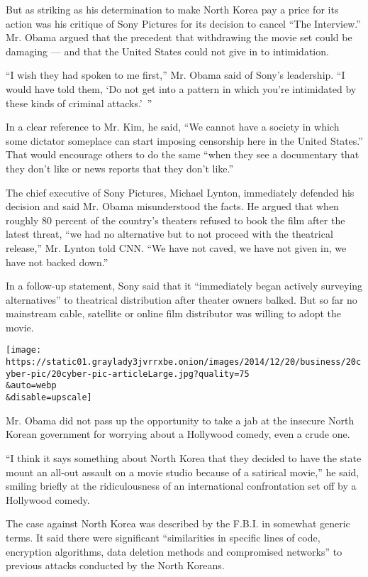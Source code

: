 But as striking as his determination to make North Korea pay a price for
its action was his critique of Sony Pictures for its decision to cancel
``The Interview.'' Mr. Obama argued that the precedent that withdrawing
the movie set could be damaging --- and that the United States could not
give in to intimidation.

``I wish they had spoken to me first,'' Mr. Obama said of Sony's
leadership. ``I would have told them, `Do not get into a pattern in
which you're intimidated by these kinds of criminal attacks.'~''

In a clear reference to Mr. Kim, he said, ``We cannot have a society in
which some dictator someplace can start imposing censorship here in the
United States.'' That would encourage others to do the same ``when they
see a documentary that they don't like or news reports that they don't
like.''

The chief executive of Sony Pictures, Michael Lynton, immediately
defended his decision and said Mr. Obama misunderstood the facts. He
argued that when roughly 80 percent of the country's theaters refused to
book the film after the latest threat, ``we had no alternative but to
not proceed with the theatrical release,'' Mr. Lynton told CNN. ``We
have not caved, we have not given in, we have not backed down.''

In a follow-up statement, Sony said that it ``immediately began actively
surveying alternatives'' to theatrical distribution after theater owners
balked. But so far no mainstream cable, satellite or online film
distributor was willing to adopt the movie.

\texttt{[image: https://static01.graylady3jvrrxbe.onion/images/2014/12/20/business/20cyber-pic/20cyber-pic-articleLarge.jpg?quality=75\\\&auto=webp\\\&disable=upscale]}

Mr. Obama did not pass up the opportunity to take a jab at the insecure
North Korean government for worrying about a Hollywood comedy, even a
crude one.

``I think it says something about North Korea that they decided to have
the state mount an all-out assault on a movie studio because of a
satirical movie,'' he said, smiling briefly at the ridiculousness of an
international confrontation set off by a Hollywood comedy.

The case against North Korea was described by the F.B.I. in somewhat
generic terms. It said there were significant ``similarities in specific
lines of code, encryption algorithms, data deletion methods and
compromised networks'' to previous attacks conducted by the North
Koreans.

